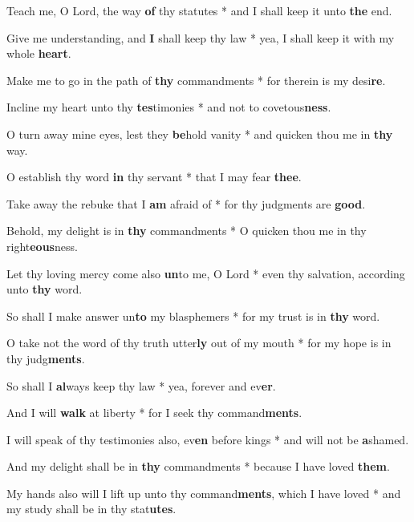 \begin{multicols}{2}
	Teach me, O Lord, the way \textbf{of} thy statutes * and I shall keep it unto \textbf{the} end.
	
	Give me understanding, and \textbf{I} shall keep thy law * yea, I shall keep it with my whole \textbf{heart}.
	
	Make me to go in the path of \textbf{thy} commandments * for therein is my desi\textbf{re}.
	
	Incline my heart unto thy \textbf{tes}timonies * and not to covetous\textbf{ness}.
	
	O turn away mine eyes, lest they \textbf{be}hold vanity * and quicken thou me in \textbf{thy} way.
	
	O establish thy word \textbf{in} thy servant * that I may fear \textbf{thee}.
	
	Take away the rebuke that I \textbf{am} afraid of * for thy judgments are \textbf{good}.
	
	Behold, my delight is in \textbf{thy} commandments * O quicken thou me in thy right\textbf{eous}ness.
	
	Let thy loving mercy come also \textbf{un}to me, O Lord * even thy salvation, according unto \textbf{thy} word.
	
	So shall I make answer un\textbf{to} my blasphemers * for my trust is in \textbf{thy} word.
	
	O take not the word of thy truth utter\textbf{ly} out of my mouth * for my hope is in thy judg\textbf{ments}.
	
	So shall I \textbf{al}ways keep thy law * yea, forever and ev\textbf{er}.
	
	And I will \textbf{walk} at liberty * for I seek thy command\textbf{ments}.
	
	I will speak of thy testimonies also, ev\textbf{en} before kings * and will not be \textbf{a}shamed.
	
	And my delight shall be in \textbf{thy} commandments * because I have loved \textbf{them}.
	
	My hands also will I lift up unto thy command\textbf{ments}, which I have loved * and my study shall be in thy stat\textbf{utes}.
\end{multicols}